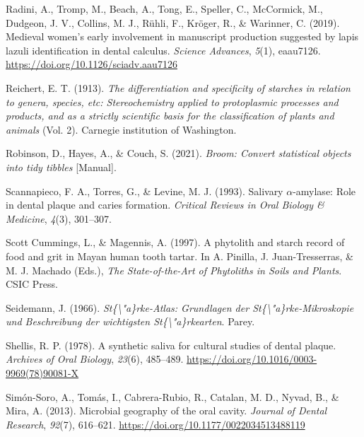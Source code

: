 \documentclass[
  b5paper,
]{book}
\newlength{\cslhangindent}
\newlength{\cslentryspacingunit} %
\newenvironment{CSLReferences}[2] %
 {%
  \setlength{\parindent}{0pt}
  \ifodd #1
  \let\oldpar\par
  \def\par{\hangindent=\cslhangindent\oldpar}
  \fi
  \setlength{\parskip}{#2\cslentryspacingunit}
 }%
 {}
\begin{document}
\begin{CSLReferences}{1}{0}
\leavevmode{}%
Radini, A., Tromp, M., Beach, A., Tong, E., Speller, C., McCormick, M.,
Dudgeon, J. V., Collins, M. J., Rühli, F., Kröger, R., \& Warinner, C.
(2019). Medieval women's early involvement in manuscript production
suggested by lapis lazuli identification in dental calculus.
\emph{Science Advances}, \emph{5}(1), eaau7126.
\url{https://doi.org/10.1126/sciadv.aau7126}

\leavevmode{}%
Reichert, E. T. (1913). \emph{The differentiation and specificity of
starches in relation to genera, species, etc: Stereochemistry applied to
protoplasmic processes and products, and as a strictly scientific basis
for the classification of plants and animals} (Vol. 2). {Carnegie
institution of Washington}.

\leavevmode{}%
Robinson, D., Hayes, A., \& Couch, S. (2021). \emph{Broom: {Convert}
statistical objects into tidy tibbles} {[}Manual{]}.

\leavevmode{}%
Scannapieco, F. A., Torres, G., \& Levine, M. J. (1993). Salivary
{\(\alpha\)}-amylase: Role in dental plaque and caries formation.
\emph{Critical Reviews in Oral Biology \& Medicine}, \emph{4}(3),
301--307.

\leavevmode{}%
Scott Cummings, L., \& Magennis, A. (1997). A phytolith and starch
record of food and grit in {Mayan} human tooth tartar. In A. Pinilla, J.
Juan-Tresserras, \& M. J. Machado (Eds.), \emph{The {State-of-the-Art}
of {Phytoliths} in {Soils} and {Plants}}. {CSIC Press}.

\leavevmode{}%
Seidemann, J. (1966). \emph{St\{{\textbackslash{}}"a\}rke-{Atlas}:
{Grundlagen} der {St}\{{\textbackslash{}}"a\}rke-{Mikroskopie} und
{Beschreibung} der wichtigsten {St}\{{\textbackslash{}}"a\}rkearten}.
{Parey}.

\leavevmode{}%
Shellis, R. P. (1978). A synthetic saliva for cultural studies of dental
plaque. \emph{Archives of Oral Biology}, \emph{23}(6), 485--489.
\url{https://doi.org/10.1016/0003-9969(78)90081-X}

\leavevmode{}%
Simón-Soro, A., Tomás, I., Cabrera-Rubio, R., Catalan, M. D., Nyvad, B.,
\& Mira, A. (2013). Microbial geography of the oral cavity.
\emph{Journal of Dental Research}, \emph{92}(7), 616--621.
\url{https://doi.org/10.1177/0022034513488119}


\end{CSLReferences}
\end{document}
